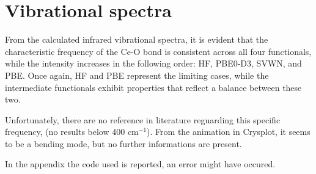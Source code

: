 \documentclass{article}
\begin{document}
\newpage
\section{Vibrational spectra}
From the calculated infrared vibrational spectra, it is evident that the characteristic frequency of the Ce-O bond is consistent across all four functionals, while the intensity increases in the following order: HF, PBE0-D3, SVWN, and PBE. Once again, HF and PBE represent the limiting cases, while the intermediate functionals exhibit properties that reflect a balance between these two. 

Unfortunately, there are no reference in literature reguarding this specific frequency, (no results below 400 cm$^{-1}$). From the animation in Crysplot, it seems to be a bending mode, but no further informations are present.

In the appendix the code used is reported, an error might have occured.

\vspace{15pt}
\end{document}
